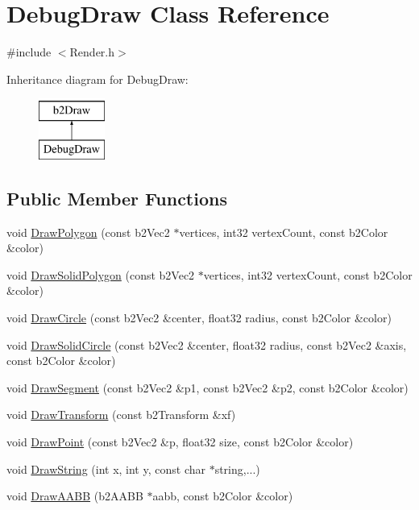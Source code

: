 \hypertarget{classDebugDraw}{\section{Debug\-Draw Class Reference}
\label{classDebugDraw}
}


{\ttfamily \#include $<$Render.\-h$>$}

Inheritance diagram for Debug\-Draw\-:\begin{figure}[H]
\begin{center}
\leavevmode
\includegraphics[height=2.000000cm]{classDebugDraw}
\end{center}
\end{figure}
\subsection*{Public Member Functions}
\begin{DoxyCompactItemize}
\item 
void \hyperlink{classDebugDraw_a14ab8cf80799e57df5414db216552962}{Draw\-Polygon} (const b2\-Vec2 $\ast$vertices, int32 vertex\-Count, const b2\-Color \&color)
\item 
void \hyperlink{classDebugDraw_a1562ce91df605efef3cdf300be267cc2}{Draw\-Solid\-Polygon} (const b2\-Vec2 $\ast$vertices, int32 vertex\-Count, const b2\-Color \&color)
\item 
void \hyperlink{classDebugDraw_a5adb064981a67fefe7064820006b673e}{Draw\-Circle} (const b2\-Vec2 \&center, float32 radius, const b2\-Color \&color)
\item 
void \hyperlink{classDebugDraw_a82428519034f36a01941dd19d6108bee}{Draw\-Solid\-Circle} (const b2\-Vec2 \&center, float32 radius, const b2\-Vec2 \&axis, const b2\-Color \&color)
\item 
void \hyperlink{classDebugDraw_a69927caae41d26f23dea336a1269ee4e}{Draw\-Segment} (const b2\-Vec2 \&p1, const b2\-Vec2 \&p2, const b2\-Color \&color)
\item 
void \hyperlink{classDebugDraw_a6f61d333e6e76865ec4a6099ab31ae75}{Draw\-Transform} (const b2\-Transform \&xf)
\item 
void \hyperlink{classDebugDraw_a1f9c99b818e21078a53d11a5ca6e2c79}{Draw\-Point} (const b2\-Vec2 \&p, float32 size, const b2\-Color \&color)
\item 
void \hyperlink{classDebugDraw_a395164a66033cc6e3b7fb596a67f2ea4}{Draw\-String} (int x, int y, const char $\ast$string,...)
\item 
void \hyperlink{classDebugDraw_a9a2a74e510bac791747b2b7badf750b9}{Draw\-A\-A\-B\-B} (b2\-A\-A\-B\-B $\ast$aabb, const b2\-Color \&color)
\end{DoxyCompactItemize}


